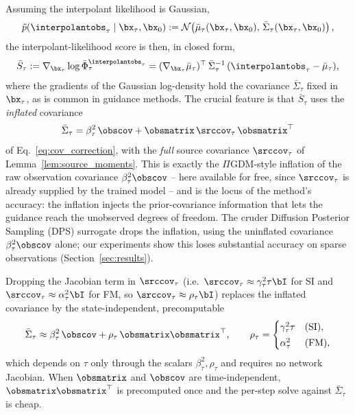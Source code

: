 Assuming the interpolant likelihood is Gaussian,
\begin{align}\label{eq:interpolant_likelihood_gaussian}
    \tilde{p}(\interpolantobs_\tau \mid \bx_\tau, \bx_0)
    := \mathcal{N}\!\left(\bar{\mu}_\tau(\bx_\tau, \bx_0),\, \bar{\Sigma}_\tau(\bx_\tau, \bx_0)\right),
\end{align}
the interpolant-likelihood score is then, in closed form,
\begin{align}\label{eq:interpolant_score_closed}
    \bar{S}_\tau := \nabla_{\bx_\tau}\log\bar{\Phi}_\tau^{\interpolantobs_\tau}
    = (\nabla_{\bx_\tau}\bar{\mu}_\tau)^\top\,\bar{\Sigma}_\tau^{-1}\,(\interpolantobs_\tau - \bar{\mu}_\tau),
\end{align}
where the gradients of the Gaussian log-density hold the covariance $\bar{\Sigma}_\tau$ fixed in $\bx_\tau$, as is common in guidance methods. The crucial feature is that $\bar S_\tau$ uses the \emph{inflated} covariance
\begin{align}\label{eq:inflated_covariance}
    \bar{\Sigma}_\tau = \beta_\tau^2\,\obscov + \obsmatrix\,\srccov_\tau\,\obsmatrix^\top
\end{align}
of Eq.~\eqref{eq:cov_correction}, with the \emph{full} source covariance $\srccov_\tau$ of Lemma~\ref{lem:source_moments}. This is exactly the $\Pi$GDM-style inflation \cite{song_pseudoinverse_2023} of the raw observation covariance $\beta_\tau^2\obscov$ -- here available for free, since $\srccov_\tau$ is already supplied by the trained model -- and is the locus of the method's accuracy: the inflation injects the prior-covariance information that lets the guidance reach the unobserved degrees of freedom. The cruder Diffusion Posterior Sampling (DPS) surrogate \cite{chung_diffusion_2023, chung_improving_2024, song_score-based_2021} drops the inflation, using the uninflated covariance $\beta_\tau^2\obscov$ alone; our experiments show this loses substantial accuracy on sparse observations (Section~\ref{sec:results}).

\begin{corollary}\label{cor:cheap_drift}
Dropping the Jacobian term in $\srccov_\tau$ (i.e.\ $\srccov_\tau\approx\gamma_\tau^2\tau\bI$ for SI and $\srccov_\tau\approx\alpha_\tau^2\bI$ for FM, so $\srccov_\tau\approx\rho_\tau\bI$) replaces the inflated covariance by the state-independent, precomputable
\begin{align}\label{eq:cov_cheap}
    \bar{\Sigma}_\tau \approx \beta_\tau^2\,\obscov + \rho_\tau\,\obsmatrix\obsmatrix^\top,
    \qquad
    \rho_\tau = \begin{cases} \gamma_\tau^2\tau & \text{(SI)},\\[2pt] \alpha_\tau^2 & \text{(FM)},\end{cases}
\end{align}
which depends on $\tau$ only through the scalars $\beta_\tau^2,\rho_\tau$ and requires no network Jacobian. When $\obsmatrix$ and $\obscov$ are time-independent, $\obsmatrix\obsmatrix^\top$ is precomputed once and the per-step solve against $\bar{\Sigma}_\tau$ is cheap.
\end{corollary}

